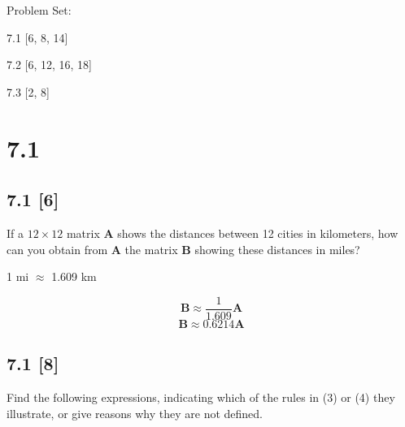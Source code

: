 \documentclass{article}
\begin{document}
{\large \noindent Problem Set:}

\par 7.1 [6, 8, 14]
\par 7.2 [6, 12, 16, 18]
\par 7.3 [2, 8]
\vspace{5mm}

\noindent \hrulefill

\section*{7.1}
\setcounter{equation}{0}

\subsection*{7.1 [6]}

\par If a $12\times12$ matrix {\textbf{A}} shows the distances between 12 cities in kilometers, how can you obtain from \textbf{A} the matrix \textbf{B} showing these distances in miles?

\begin{center}
    1 mi $\approx$ 1.609 km
\end{center}
\begin{equation}
    \textbf{B} \approx \frac{1}{1.609} \textbf{A}
\end{equation}
\begin{equation}
    \textbf{B} \approx 0.6214\textbf{A}
\end{equation}

\subsection*{7.1 [8]}
\setcounter{equation}{0}
\par Find the following expressions, indicating which of the rules in (3) or (4) they illustrate, or give reasons why they are not defined.

\def \Amatrix {
    \begin{bmatrix}
    0 & 2 & 4\\
    6 & 5 & 5\\
    1 & 0 & -3
    \end{bmatrix}
}
\def \Bmatrix {
    \begin{bmatrix}
    0 & 5 & 2\\
    5 & 3 & 4\\
    -2 & 4 & -2
    \end{bmatrix}
}
\end{document}
